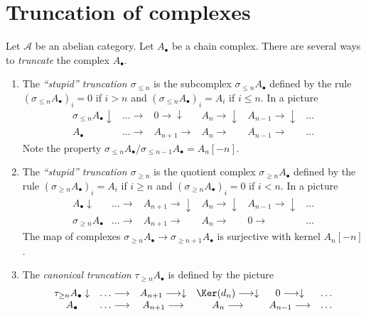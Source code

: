 \section{Truncation of complexes}
\label{homology-section-truncations}
Let $\mathcal{A}$ be an abelian category.
Let $A_\bullet$ be a chain complex. There
are several ways to {\it truncate} the complex $A_\bullet$.
\begin{enumerate}
\item The {\it ``stupid'' truncation $\sigma_{\leq n}$}
is the subcomplex $\sigma_{\leq n} A_\bullet$ defined
by the rule $(\sigma_{\leq n} A_\bullet)_i = 0$ if
$i > n$ and $(\sigma_{\leq n} A_\bullet)_i = A_i$ if
$i \leq n$. In a picture
$$
\begin{array}{cccccc}\sigma_{\leq n}A_\bullet \downarrow & \ldots \longrightarrow & 0 \longrightarrow\downarrow & A_n \longrightarrow\downarrow & A_{n - 1} \longrightarrow\downarrow & \ldots \\ A_\bullet & \ldots \longrightarrow & A_{n + 1} \longrightarrow & A_n \longrightarrow & A_{n - 1} \longrightarrow & \ldots\end{array}
$$
Note the property
$\sigma_{\leq n}A_\bullet / \sigma_{\leq n - 1}A_\bullet = A_n[-n]$.
\item The {\it ``stupid'' truncation $\sigma_{\geq n}$}
is the quotient complex $\sigma_{\geq n} A_\bullet$ defined
by the rule $(\sigma_{\geq n} A_\bullet)_i = A_i$ if
$i \geq n$ and $(\sigma_{\geq n} A_\bullet)_i = 0$ if
$i < n$. In a picture
$$
\begin{array}{cccccc}A_\bullet \downarrow & \ldots \longrightarrow & A_{n + 1} \longrightarrow\downarrow & A_n \longrightarrow\downarrow & A_{n - 1} \longrightarrow\downarrow & \ldots \\ \sigma_{\geq n}A_\bullet & \ldots \longrightarrow & A_{n + 1} \longrightarrow & A_n \longrightarrow & 0 \longrightarrow & \ldots\end{array}
$$
The map of complexes
$\sigma_{\geq n}A_\bullet \to \sigma_{\geq n + 1}A_\bullet$ is surjective
with kernel $A_n[-n]$.
\item The {\it canonical truncation} $\tau_{\geq n}A_\bullet$
is defined by the picture
$$
\begin{array}{cccccc}\tau_{\geq n}A_\bullet \downarrow & \ldots \longrightarrow & A_{n + 1} \longrightarrow\downarrow & \Ker(d_n) \longrightarrow\downarrow & 0 \longrightarrow\downarrow & \ldots \\ A_\bullet & \ldots \longrightarrow & A_{n + 1} \longrightarrow & A_n \longrightarrow & A_{n - 1} \longrightarrow & \ldots\end{array}
$$
\end{enumerate}
